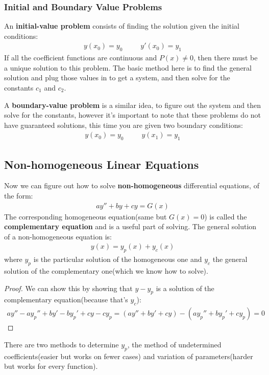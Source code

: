 \documentclass{article}
\begin{document}
\subsubsection{Initial and Boundary Value Problems}
An \textbf{initial-value problem} consists of finding the solution given the initial conditions:
\begin{gather*}
    y(x_0) = y_0\hspace{30pt}y'(x_0) = y_1
\end{gather*}
If all the coefficient functions are continuous and $P(x) \neq 0$, then there must be a unique solution to this problem. The basic method here is to find the general solution and plug those values in to get a system, and then solve for the constants $c_1$ and $c_2$.

A \textbf{boundary-value problem} is a similar idea, to figure out the system and then solve for the constants, however it's important to note that these problems do not have guaranteed solutions, this time you are given two boundary conditions:
\begin{gather*}
    y(x_0) = y_0\hspace{30pt}y(x_1)=y_1
\end{gather*}
\subsection{Non-homogeneous Linear Equations}
Now we can figure out how to solve \textbf{non-homogeneous} differential equations, of the form:
\begin{gather*}
    ay'' + by + cy = G(x)
\end{gather*}
The corresponding homogeneous equation(same but $G(x) = 0$) is called the \textbf{complementary equation} and is a useful part of solving. The general solution of a non-homogeneous equation is:
\begin{gather*}
    y(x) = y_p(x) + y_c(x)
\end{gather*}
where $y_p$ is the particular solution of the homogeneous one and $y_c$ the general solution of the complementary one(which we know how to solve).
\begin{proof}
We can show this by showing that $y-y_p$ is a solution of the complementary equation(because that's $y_c$):
\begin{gather*}
    ay'' - ay_p'' + by' - by_p' + cy - cy_p = (ay'' + by' + cy) - (ay_p'' + by_p' + cy_p) = 0
\end{gather*}
\end{proof}
There are two methods to determine $y_p$, the method of undetermined coefficients(easier but works on fewer cases) and variation of parameters(harder but works for every function).
\end{document}

